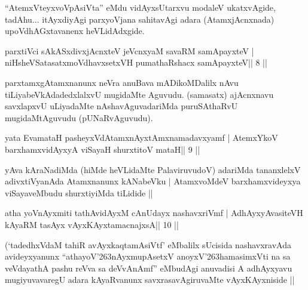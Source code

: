 \begin{artha}
``AtemxVteyxvoVpAsiVta'' eMdu vidAyxsUtarxvu modaleV ukatxvAgide, tadAhu... itAyxdiyAgi parxyoVjana sahitavAgi adara (AtamxjAcnxnada) upoVdhAGxtavanenx heVLidAdxgide.
\end{artha} 
 

\begin{shl}
parxtiVci sAkASxdivxjAcnxteV jeVcnxyaM savaRM samApayxteV |
niHsheVSatasatxmoVdhavxsetxVH pumathaRshacx samApayxteV\hfill || 8 ||
\end{shl}

\begin{artha}
parxtamxgAtamxnanunx neVra anuBava mADikoMDalilx nAvu tiLiyabeVkAdadedxlalxvU mugidaMte Aguvudu. (samasatx) ajAcnxnavu savxlapxvU uLiyadaMte nAshavAguvada\-riMda puruSAthaRvU mugidaMtAguvudu (pUNaRvAguvudu).
\end{artha}

\begin{shl}
yata EvamataH pasheyxVdAtamxnAyxtAmxnamadavxyamf |
AtemxYkoV barxhamxvidAyxyA viSayaH shurxtitoV mataH\hfill || 9 ||
\end{shl}

\begin{artha}
yAva kAraNadiMda (hiMde heVLidaMte PalaviruvudoV) adariMda tananxlelxV adivxtiVyanAda Atamxnanunx kANabeVku | AtamxvoMdeV barxhamxvideyxya viSayaveMbudu shurxtiyiMda tiLidide || 
\end{artha} 
 
 

\begin{shl}
atha yoV\s nAyxmiti tathA\s vidAyxM cAnUdayx nashavxriVmf |
A\s dhAyxyAvasiteVH kAyaRM tasAyx vAyxKAyxtamacnajxsA\hfill || 10 ||
\end{shl}

\begin{artha}
(`tadedhxVdaM tahiR avAyxkaqtamAsiVtf' eMbalilx sUcisida nashavxravAda 
avideyxyanunx ``athayoV\char'263nAyxmupAsetxV anoyxV\char'263hamasimxVti na sa veVdayathA pashu reVva sa deVvAnAmf'' eMbudAgi anuvadisi A adhAyx\-yavu mugiyuvavaregU adara kAyaRvanunx savxrasavAgiruvaMte vAyxKAyxniside ||
\end{artha} 
 
 
